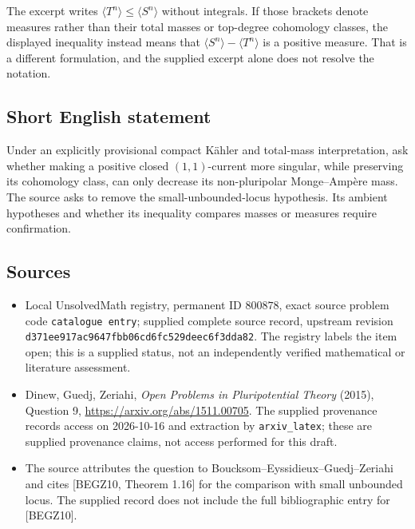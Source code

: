 \documentclass[11pt]{article}
\begin{document}
The excerpt writes \(\langle T^n\rangle\leq\langle S^n\rangle\) without integrals. If those brackets denote measures rather than their total masses or top-degree cohomology classes, the displayed inequality instead means that \(\langle S^n\rangle-\langle T^n\rangle\) is a positive measure. That is a different formulation, and the supplied excerpt alone does not resolve the notation.
\subsection{Short English statement}
Under an explicitly provisional compact K\"ahler and total-mass interpretation, ask whether making a positive closed \((1,1)\)-current more singular, while preserving its cohomology class, can only decrease its non-pluripolar Monge--Amp\`ere mass. The source asks to remove the small-unbounded-locus hypothesis. Its ambient hypotheses and whether its inequality compares masses or measures require confirmation.
\subsection{Sources}
\begin{itemize}
\item Local UnsolvedMath registry, permanent ID \(800878\), exact source problem code \texttt{catalogue entry}; supplied complete source record, upstream revision \texttt{d371ee917ac9647fbb06cd6fc529deec6f3dda82}. The registry labels the item open; this is a supplied status, not an independently verified mathematical or literature assessment.
\item Dinew, Guedj, Zeriahi, \emph{Open Problems in Pluripotential Theory} (2015), Question 9, \url{https://arxiv.org/abs/1511.00705}. The supplied provenance records access on 2026-10-16 and extraction by \texttt{arxiv\_latex}; these are supplied provenance claims, not access performed for this draft.
\item The source attributes the question to Boucksom--Eyssidieux--Guedj--Zeriahi and cites [BEGZ10, Theorem 1.16] for the comparison with small unbounded locus. The supplied record does not include the full bibliographic entry for [BEGZ10].
\end{itemize}
\end{document}
